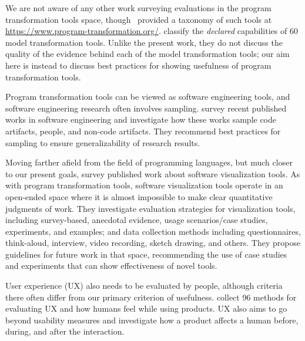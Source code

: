 We are not aware of any other work surveying evaluations in the program
transformation tools space, though~
provided a taxonomy of such tools at \url{https://www.program-transformation.org/}.
 classify the
\emph{declared} capabilities of 60 model transformation tools. Unlike
the present work, they do not discuss the quality of the evidence
behind each of the model transformation tools; our aim here is instead
to discuss best practices for showing usefulness of program
transformation tools.

Program transformation tools can be viewed as software engineering
tools, and software engineering research often involves sampling. 
 survey recent
published works in software engineering and investigate how these works sample code
artifacts, people, and non-code artifacts.  They recommend best
practices for sampling to ensure generalizability of research results.

Moving farther afield from the field of programming languages, but
much closer to our present goals,
 survey
published work about software visualization tools. As with
program transformation tools, software visualization tools operate in
an open-ended space where it is almost impossible to make clear
quantitative judgments of work. They investigate evaluation strategies
for visualization tools, including survey-based, anecdotal evidence,
usage scenarios/case studies, experiments, and examples; and data
collection methods including questionnaires, think-aloud, interview,
video recording, sketch drawing, and others. They propose guidelines
for future work in that space, recommending the use of case studies
and experiments that can show effectiveness of novel tools.

User experience (UX) also needs to be evaluated by people, although
criteria there often differ from our primary criterion of
usefulness.  collect 96
methods for evaluating UX and how humans feel while using products.
UX also aims to go beyond usability measures and investigate
how a product affects a human before, during, and after the interaction.
